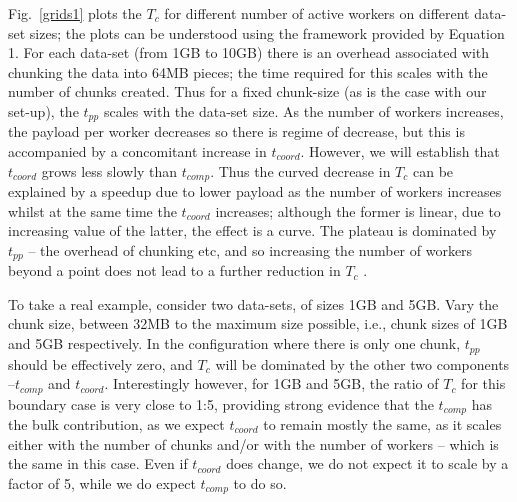\documentclass[conference,final]{IEEEtran}
\newcommand{\tc }{ $T_c$ }
\begin{document}
Fig.~\ref{grids1} plots the \tc for different number of active workers
on different data-set sizes; the plots can be understood using the
framework provided by Equation 1. For each data-set (from 1GB to 10GB)
there is an overhead associated with chunking the data into 64MB
pieces; the time required for this scales with the number of chunks
created.  Thus for a fixed chunk-size (as is the case with our
set-up), the $t_{pp}$ scales with the data-set size. As the number of
workers increases, the payload per worker decreases so there is regime
of decrease, but this is accompanied by a concomitant increase in
$t_{coord}$. However, we will establish that $t_{coord}$ grows less
slowly than $t_{comp}$. Thus the curved decrease in \tc can be
explained by a speedup due to lower payload as the number of workers
increases whilst at the same time the $t_{coord}$ increases; although
the former is linear, due to increasing value of the latter, the
effect is a curve. The plateau is dominated by $t_{pp}$ -- the
overhead of chunking etc, and so increasing the number of workers
beyond a point does not lead to a further reduction in \tc.

To take a real example, consider two data-sets, of sizes 1GB and 5GB.
Vary the chunk size, between 32MB to the maximum size possible, i.e.,
chunk sizes of 1GB and 5GB respectively. In the configuration where
there is only one chunk, $t_{pp}$ should be effectively zero, and \tc
will be dominated by the other two components --$t_{comp}$ and
$t_{coord}$.  Interestingly however, for 1GB and 5GB, the ratio of \tc
for this boundary case is very close to 1:5, providing strong evidence
that the $t_{comp}$ has the bulk contribution, as we expect
$t_{coord}$ to remain mostly the same, as it scales either with the number 
of chunks and/or with the number of workers -- which is 
the same in this case.  Even if $t_{coord}$ does change, we do not
expect it to scale by a factor of 5, while we do expect $t_{comp}$ to
do so.




\end{document}
